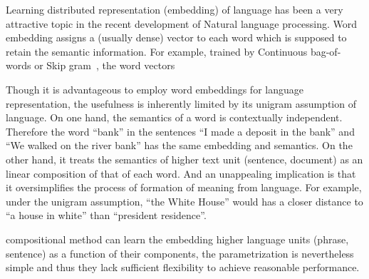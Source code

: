 Learning distributed representation (embedding) of language has been a very
attractive topic in the recent development of Natural language processing. Word
embedding assigns a (usually dense) vector to each word which is supposed to
retain the semantic information. For example, trained by Continuous bag-of-words
or Skip gram~\cite{mikolov2013distributed}, the word vectors

Though it is advantageous to employ word
embeddings for language representation, the usefulness is inherently limited by
its unigram assumption of language. On one hand, the semantics of a word is
contextually independent. Therefore the word ``bank'' in the sentences ``I made
a deposit in the bank'' and ``We walked on the river bank'' has the same
embedding and semantics. On the other hand, it treats the semantics of higher
text unit (sentence, document) as an linear composition of that of each word.
And an unappealing implication is that it oversimplifies the process of
formation of meaning from language. For example, under the unigram assumption,
``the White House'' would has a closer distance to ``a house in white'' than
``president residence''.

compositional method can learn the
embedding higher language units (\eg phrase, sentence) as a function of their
components, the parametrization is nevertheless simple and thus they lack
sufficient flexibility to achieve reasonable performance.
